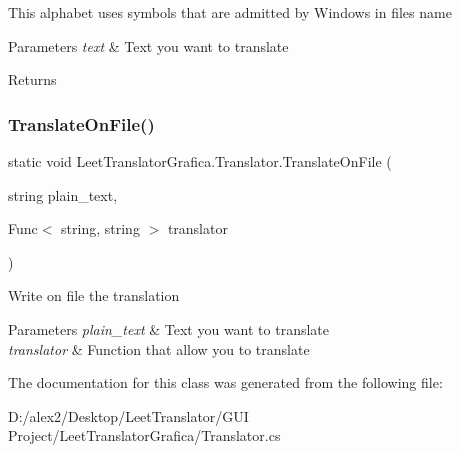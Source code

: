 This alphabet uses symbols that are admitted by Windows in files\textquotesingle{} name 


\begin{DoxyParams}{Parameters}
{\em text} & Text you want to translate\\
\hline
\end{DoxyParams}
\begin{DoxyReturn}{Returns}

\end{DoxyReturn}
\mbox{\label{class_leet_translator_grafica_1_1_translator_a703defc4c40ffed8c59117dbabea532c}} 
\subsubsection{\texorpdfstring{Translate\+On\+File()}{TranslateOnFile()}}
{\footnotesize\ttfamily static void Leet\+Translator\+Grafica.\+Translator.\+Translate\+On\+File (\begin{DoxyParamCaption}\item[{string}]{plain\+\_\+text,  }\item[{Func$<$ string, string $>$}]{translator }\end{DoxyParamCaption})\hspace{0.3cm}{\ttfamily [static]}}



Write on file the translation 


\begin{DoxyParams}{Parameters}
{\em plain\+\_\+text} & Text you want to translate\\
\hline
{\em translator} & Function that allow you to translate\\
\hline
\end{DoxyParams}


The documentation for this class was generated from the following file\+:\begin{DoxyCompactItemize}
\item 
D\+:/alex2/\+Desktop/\+Leet\+Translator/\+G\+U\+I Project/\+Leet\+Translator\+Grafica/Translator.\+cs\end{DoxyCompactItemize}
